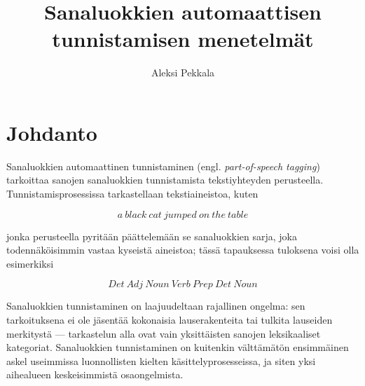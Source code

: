 \documentclass[utf8,bachelor,manualbib]{gradu3}
\begin{document}
\title{Sanaluokkien automaattisen tunnistamisen menetelmät}



\author{Aleksi Pekkala}

\maketitle
  
\mainmatter


\chapter{Johdanto}


Sanaluokkien automaattinen tunnistaminen (engl. \emph{part-of-speech tagging}) tarkoittaa sanojen sanaluokkien tunnistamista tekstiyhteyden perusteella.  Tunnistamisprosessissa tarkastellaan tekstiaineistoa, kuten

\[a\:black\:cat\:jumped\:on\:the\:table\]

jonka perusteella pyritään päättelemään se sanaluokkien sarja, joka todennäköisimmin vastaa kyseistä aineistoa; tässä tapauksessa tuloksena voisi olla esimerkiksi

\[Det\:Adj\:Noun\:Verb\:Prep\:Det\:Noun\]

Sanaluokkien tunnistaminen on laajuudeltaan rajallinen ongelma: sen tarkoituksena ei ole jäsentää kokonaisia lauserakenteita tai tulkita lauseiden merkitystä --- tarkastelun alla ovat vain yksittäisten sanojen leksikaaliset kategoriat. Sanaluokkien tunnistaminen on kuitenkin välttämätön ensimmäinen askel useimmissa luonnollisten kielten käsittelyprosesseissa, ja siten yksi aihealueen keskeisimmistä osaongelmista.
\end{document}
